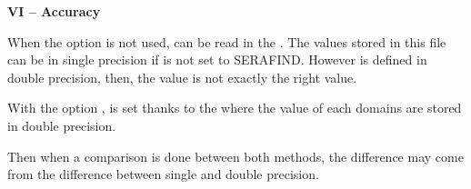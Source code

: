 \textbf{VI -- Accuracy}

When the option  is not used,  can be read
in the .
The values stored in this file can be in single precision if 
 is not set to SERAFIND.
However  is defined in double precision, then,
the  value is not exactly the right value.

With the option ,  is set
thanks to the  where the value of each domains
are stored in double precision.

Then when a comparison is done between both methods, the difference may come
from the difference between single and double precision.
